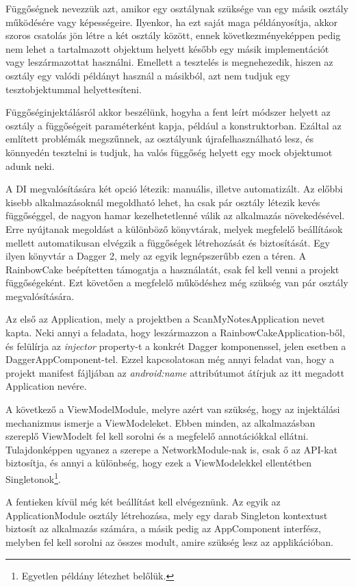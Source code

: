 Függőségnek nevezzük azt, amikor egy osztálynak szüksége van egy másik osztály működésére vagy képességeire. Ilyenkor, ha ezt saját maga példányosítja, akkor szoros csatolás jön létre a két osztály között, ennek következményeképpen pedig nem lehet a tartalmazott objektum helyett később egy másik implementációt vagy leszármazottat használni. Emellett a tesztelés is megnehezedik, hiszen az osztály egy valódi példányt használ a másikból, azt nem tudjuk egy tesztobjektummal helyettesíteni.

Függőséginjektálásról akkor beszélünk, hogyha a fent leírt módszer helyett az osztály a függőségeit paraméterként kapja, például a konstruktorban. Ezáltal az említett problémák megszűnnek, az osztályunk újrafelhasználható lesz, és könnyedén tesztelni is tudjuk, ha valós függőség helyett egy mock objektumot adunk neki. 

A DI megvalósítására két opció létezik: manuális, illetve automatizált. Az előbbi kisebb alkalmazásoknál megoldható lehet, ha csak pár osztály létezik kevés függőséggel, de nagyon hamar kezelhetetlenné válik az alkalmazás növekedésével. Erre nyújtanak megoldást a különböző könyvtárak, melyek megfelelő beállítások mellett automatikusan elvégzik a függőségek létrehozását és biztosítását. 
Egy ilyen könyvtár a Dagger 2, mely az egyik legnépszerűbb ezen a téren. A RainbowCake beépítetten támogatja a használatát, csak fel kell venni a projekt függőségeként. Ezt követően a megfelelő működéshez még szükség van pár osztály megvalósítására. 

Az első az Application, mely a projektben a ScanMyNotesApplication nevet kapta. Neki annyi a feladata, hogy leszármazzon a RainbowCakeApplication-ből, és felülírja az \emph{injector} property-t a konkrét Dagger komponenssel, jelen esetben a DaggerAppComponent-tel. Ezzel kapcsolatosan még annyi feladat van, hogy a projekt manifest fájljában az \emph{android:name} attribútumot átírjuk az itt megadott Application nevére.

A következő a ViewModelModule, melyre azért van szükség, hogy az injektálási mechanizmus ismerje a ViewModeleket. Ebben minden, az alkalmazásban szereplő ViewModelt fel kell sorolni és a megfelelő annotációkkal ellátni. Tulajdonképpen ugyanez a szerepe a NetworkModule-nak is, csak ő az API-kat biztosítja, és annyi a különbség, hogy ezek a ViewModelekkel ellentétben Singletonok\footnote{Egyetlen példány létezhet belőlük.}. 

A fentieken kívül még két beállítást kell elvégeznünk. Az egyik az ApplicationModule osztály létrehozása, mely egy darab Singleton kontextust biztosít az alkalmazás számára, a másik pedig az AppComponent interfész, melyben fel kell sorolni az összes modult, amire szükség lesz az applikációban. 

